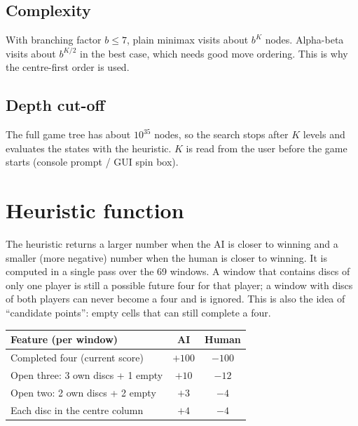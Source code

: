 \documentclass[11pt,a4paper]{article}
\begin{document}
\subsection{Complexity}
With branching factor $b \le 7$, plain minimax visits about $b^{K}$ nodes. Alpha-beta
visits about $b^{K/2}$ in the best case, which needs good move ordering. This is why the
centre-first order is used.

\subsection{Depth cut-off}
The full game tree has about $10^{35}$ nodes, so the search stops after $K$ levels and
evaluates the states with the heuristic. $K$ is read from the user before the game
starts (console prompt / GUI spin box).

\section{Heuristic function}
The heuristic returns a larger number when the AI is closer to winning and a smaller
(more negative) number when the human is closer to winning. It is computed in a single
pass over the 69 windows. A window that contains discs of only one player is still a
possible future four for that player; a window with discs of both players can never
become a four and is ignored. This is also the idea of ``candidate points'': empty
cells that can still complete a four.

\begin{center}
\begin{tabular}{@{}lcc@{}}
\toprule
Feature (per window) & AI & Human\\
\midrule
Completed four (current score) & $+100$ & $-100$\\
Open three: 3 own discs + 1 empty & $+10$ & $-12$\\
Open two: 2 own discs + 2 empty & $+3$ & $-4$\\
Each disc in the centre column & $+4$ & $-4$\\
\bottomrule
\end{tabular}
\end{center}
\end{document}
